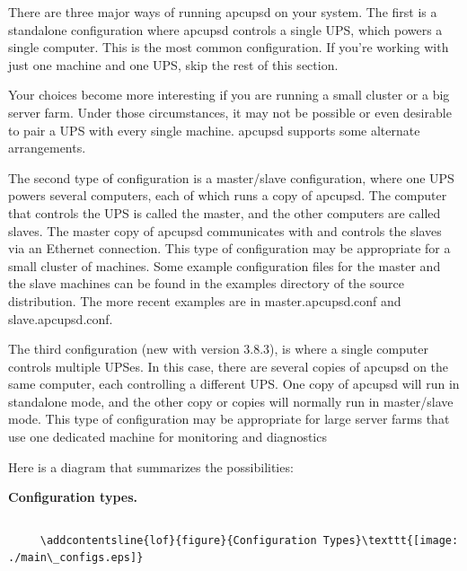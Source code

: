 \label{Choosing-a-Configuration-Type}

\label{index-Choosing-a-Configuration-Type-13}
\label{index-Configuration-Type-14}
There are three major ways of running apcupsd on your system. The first is a
standalone configuration where apcupsd controls a single UPS, which powers a
single computer.  This is the most common configuration.  If you're working
with just one machine and one UPS, skip the rest of this section.  

Your choices become more interesting if you are running a small cluster or a
big server farm.  Under those circumstances, it may not be possible or even
desirable to pair a UPS with every single machine.  apcupsd supports some
alternate arrangements.  

The second type of configuration is a master/slave configuration, where one
UPS powers several computers, each of which runs a copy of apcupsd.  The
computer that controls the UPS is called the master, and the other computers
are called slaves.  The master copy of apcupsd communicates with and controls
the slaves via an Ethernet connection.  This type of configuration may be
appropriate for a small cluster of machines.  Some example configuration files
for the master and the slave machines can be found in the examples directory
of the source distribution.  The more recent examples are in
master.apcupsd.conf and slave.apcupsd.conf.  

The third configuration (new with version 3.8.3), is where a single computer
controls multiple UPSes. In this case, there are several copies of apcupsd on
the same computer, each controlling a different UPS. One copy of apcupsd will
run in standalone mode, and the other copy or copies will normally run in
master/slave mode.  This type of configuration may be appropriate for large
server farms that use one dedicated machine for monitoring and diagnostics  

Here is a diagram that summarizes the possibilities: 

\label{Configuration-types_005f}

{\bf Configuration types.}  

\footnotesize
\begin{verbatim}
\end{verbatim}
\normalsize

\footnotesize
\begin{verbatim}
     \addcontentsline{lof}{figure}{Configuration Types}\texttt{[image: ./main\_configs.eps]}
\end{verbatim}
\normalsize

